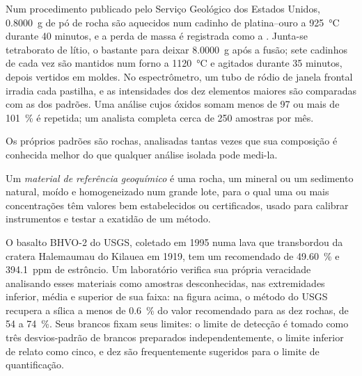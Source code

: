 \begin{inthelab}
Num procedimento publicado pelo Serviço Geológico dos Estados Unidos, \qty{0.8000}{g} de pó de rocha são aquecidos num
cadinho de platina--ouro a \qty{925}{\celsius} durante 40 minutos, e a perda de massa é registrada como
a . Junta-se tetraborato de lítio, o bastante para deixar \qty{8.0000}{g} após a fusão;
sete cadinhos de cada vez são mantidos num forno a \qty{1120}{\celsius} e agitados durante 35 minutos,
depois vertidos em moldes. No espectrômetro, um tubo de ródio de janela frontal irradia cada pastilha, e
as intensidades dos dez elementos maiores são comparadas com as dos padrões. Uma análise cujos
óxidos somam menos de 97 ou mais de \qty{101}{\percent} é repetida; um analista completa
cerca de 250 amostras por mês.
\end{inthelab}

Os próprios padrões são rochas, analisadas tantas vezes que sua composição é conhecida melhor do que
qualquer análise isolada pode medi-la.

\begin{definition}\label{def:b2:field-lab-methods-2:rm}
Um \emph{material de referência geoquímico} é uma rocha, um
mineral ou um sedimento natural, moído e homogeneizado num grande lote, para o qual uma ou mais concentrações
têm valores bem estabelecidos ou certificados, usado para calibrar instrumentos e testar a exatidão
de um método.
\end{definition}

O basalto BHVO-2 do USGS, coletado em 1995 numa lava que transbordou da cratera Halemaumau do
Kilauea em 1919, tem um  recomendado de \qty{49.60}{\percent} e \qty{394.1}{ppm} de
estrôncio. Um laboratório verifica sua própria veracidade analisando esses materiais como amostras desconhecidas, nas extremidades
inferior, média e superior de sua faixa: na figura acima, o método do USGS recupera a sílica a menos de
\qty{0.6}{\percent} do valor recomendado para as dez rochas, de  54 a
\qty{74}{\percent}. Seus brancos fixam seus limites: o limite de detecção é tomado como três desvios-padrão
de brancos preparados independentemente, o limite inferior de relato como cinco, e dez são frequentemente
sugeridos para o limite de quantificação.

